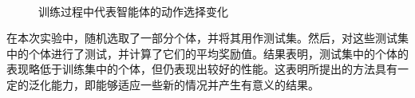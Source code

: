 \begin{figure}[htbp]
  \quad\quad
  \\
  \quad\quad
  \caption{训练过程中代表智能体的动作选择变化}
  \label{com}
\end{figure}

在本次实验中，随机选取了一部分个体，并将其用作测试集。然后，对这些测试集中的个体进行了测试，并计算了它们的平均奖励值。结果表明，测试集中的个体的表现略低于训练集中的个体，但仍表现出较好的性能。这表明所提出的方法具有一定的泛化能力，即能够适应一些新的情况并产生有意义的结果。


